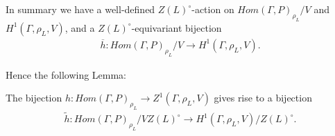 In summary we have a well-defined $Z(L)^\circ$-action on $Hom(\Gamma, P)_{\rho_L}/V$ and $H^1(\Gamma, \rho_L, V)$, and a $Z(L)^\circ$-equivariant bijection 
\begin{eqnarray*}
  \overline{h}:Hom(\Gamma, P)_{\rho_L}/V \rightarrow H^1(\Gamma, \rho_L, V).
\end{eqnarray*}

Hence the following Lemma:

\begin{lemma}
  The bijection $h: Hom(\Gamma, P)_{\rho_L} \rightarrow Z^1(\Gamma, \rho_L, V)$ gives rise to a bijection
  \begin{eqnarray*}
    \tilde{h}: Hom(\Gamma, P)_{\rho_L}/VZ(L)^\circ \rightarrow H^1(\Gamma, \rho_L, V)/Z(L)^\circ.
  \end{eqnarray*}
  \label{lem:vzl_h1zl}
\end{lemma}
